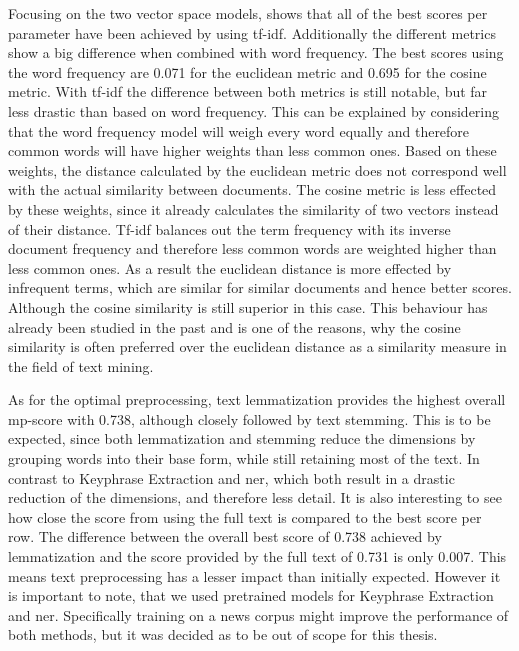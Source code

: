Focusing on the two vector space models, shows that all of the best scores per parameter have been achieved by using tf-idf.
Additionally the different metrics show a big difference when combined with word frequency.
The best scores using the word frequency are 0.071 for the euclidean metric and 0.695 for the cosine metric.
With tf-idf the difference between both metrics is still notable, but far less drastic than based on word frequency.
This can be explained by considering that the word frequency model will weigh every word equally
and therefore common words will have higher weights than less common ones.
Based on these weights, the distance calculated by the euclidean metric does not correspond well with the actual similarity between documents.
The cosine metric is less effected by these weights,
since it already calculates the similarity of two vectors instead of their distance.
Tf-idf balances out the term frequency with its inverse document frequency
and therefore less common words are weighted higher than less common ones.
As a result the euclidean distance is more effected by infrequent terms,
which are similar for similar documents and hence better scores.
Although the cosine similarity is still superior in this case.
This behaviour has already been studied in the past\cite{Strehl00impactof}\cite{similarity_measures}
and is one of the reasons, why the cosine similarity is often preferred over the euclidean distance as a similarity measure in the field of text mining.

As for the optimal preprocessing, text lemmatization provides the highest overall mp-score with 0.738,
although closely followed by text stemming.
This is to be expected, since both lemmatization and stemming reduce the dimensions by grouping words into their base form,
while still retaining most of the text.
In contrast to Keyphrase Extraction and \Gls{ner}, which both result in a drastic reduction of the dimensions, and therefore less detail.
It is also interesting to see how close the score from using the full text is compared to the best score per row.
The difference between the overall best score of 0.738 achieved by lemmatization and the score provided by the full text of 0.731 is only 0.007.
This means text preprocessing has a lesser impact than initially expected.
However it is important to note, that we used pretrained models for Keyphrase Extraction and \Gls{ner}.
Specifically training on a news corpus might improve the performance of both methods, but it was decided as to be out of scope for this thesis.


